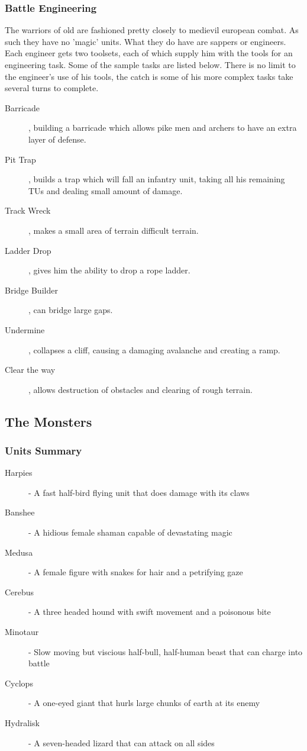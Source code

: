 \documentclass[a4paper]{article}
\begin{document}
\subsubsection{Battle Engineering}

The warriors of old are fashioned pretty closely to medievil european combat. As such they have no 'magic' units. What they do have are sappers or engineers. Each engineer gets two toolsets, each of which supply him with the tools for an engineering task. Some of the sample tasks are listed below. There is no limit to the engineer's use of his tools, the catch is some of his more complex tasks take several turns to complete.

\begin{description}
\item[Barricade], building a barricade which allows pike men and archers to have an extra layer of defense.
\item[Pit Trap], builds a trap which will fall an infantry unit, taking all his remaining TUs and dealing small amount of damage.
\item[Track Wreck], makes a small area of terrain difficult terrain.
\item[Ladder Drop], gives him the ability to drop a rope ladder.
\item[Bridge Builder], can bridge large gaps.
\item[Undermine], collapses a cliff, causing a damaging avalanche and creating a ramp.
\item[Clear the way], allows destruction of obstacles and clearing of rough terrain.
\end{description}

\subsection{The Monsters}

\subsubsection{Units Summary}
\begin{description}
\item [Harpies]- A fast half-bird flying unit that does damage with its claws
\item [Banshee]- A hidious female shaman capable of devastating magic
\item [Medusa]- A female figure with snakes for hair and a petrifying gaze

\item [Cerebus]- A three headed hound with swift movement and a poisonous bite
\item [Minotaur]- Slow moving but viscious half-bull, half-human beast that can charge into battle
\item [Cyclops]- A one-eyed giant that hurls large chunks of earth at its enemy
\item [Hydralisk]- A seven-headed lizard that can attack on all sides
\end{description}
\end{document}
